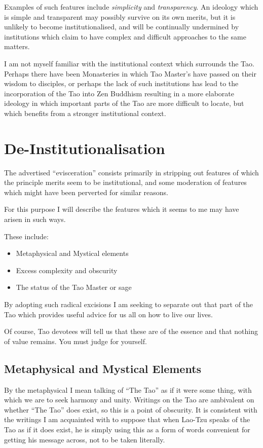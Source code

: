 \documentclass[numreferences]{rbjk}
\begin{document}
\begin{article}
Examples of such features include {\it simplicity} and {\it transparency}.
An ideology which is simple and transparent may possibly survive on its own merits, but it is unlikely to become institutionalised, and will be continually undermined by institutions which claim to have complex and difficult approaches to the same matters.

I am not myself familiar with the institutional context which surrounds the Tao.
Perhaps there have been Monasteries in which Tao Master's have passed on their wisdom to disciples, or perhaps the lack of such institutions has lead to the incorporation of the Tao into Zen Buddhism resulting in a more elaborate ideology in which important parts of the Tao are more difficult to locate, but which benefits from a stronger institutional context.

\section{De-Institutionalisation}

The advertised ``evisceration'' consists primarily in stripping out features of which the principle merits seem to be institutional, and some moderation of features which might have been perverted for similar reasons.

For this purpose I will describe the features which it seems to me may have arisen in such ways.

These include:

\begin{itemize}
\item Metaphysical and Mystical elements
\item Excess complexity and obscurity
\item The status of the Tao Master or sage
\end{itemize}

By adopting such radical excisions I am seeking to separate out that part of the Tao which provides useful advice for us all on how to live our lives.

Of course, Tao devotees will tell us that these are of the essence and that nothing of value remains.
You must judge for yourself.

\subsection{Metaphysical and Mystical Elements}

By the metaphysical I mean talking of ``The Tao'' as if it were some thing, with which we are to seek harmony and unity.
Writings on the Tao are ambivalent on whether ``The Tao'' does exist, so this is a point of obscurity.
It is consistent with the writings I am acquainted with to suppose that when Lao-Tzu speaks of the Tao as if it does exist, he is simply using this as a form of words convenient for getting his message across, not to be taken literally.


\end{article}
\end{document}
